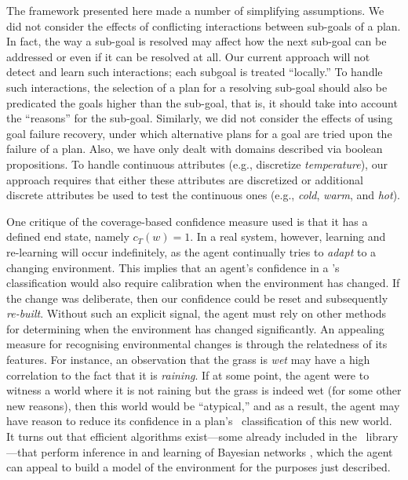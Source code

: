 The framework presented here made a number of simplifying assumptions.
We did not consider the effects of conflicting interactions between sub-goals of
a plan. In fact, the way a sub-goal is resolved may affect how the next sub-goal
can be addressed or even if it can be resolved at all.
Our current approach will not detect and learn such interactions; each subgoal
is treated ``locally.'' To handle such interactions, the selection of a plan for
a resolving sub-goal should also be predicated the goals higher than the
sub-goal, that is, it should take into account the ``reasons'' for the sub-goal.
Similarly, we did not consider the effects of using goal failure recovery, under
which alternative plans for a goal are tried upon the failure of a plan.
Also, we have only dealt with domains described via boolean propositions. To
handle continuous attributes (e.g., discretize \emph{temperature}), our approach
requires that either these attributes are discretized or additional discrete
attributes be used to test the continuous ones (e.g., \emph{cold}, \emph{warm},
and \emph{hot}).


One critique of the coverage-based confidence measure used is that it has a
defined end state, namely $c_T(w)=1$. In a real system, however, learning and
re-learning will occur indefinitely, as the agent continually tries to
\emph{adapt} to a changing environment. This implies that an agent's confidence
in a \dt's classification would also require calibration when the environment has
changed. If the change was deliberate, then our confidence could be reset and
subsequently \textit{re-built}. Without such an explicit signal, the agent must
rely on other methods for determining when the environment has changed
significantly.
An appealing measure for recognising environmental changes is through the
relatedness of its features. For instance, an observation that the grass is
\textit{wet} may have a high correlation to the fact that it is \textit{raining}.
If at some point, the agent were to witness a world where it is not raining but
the grass is indeed wet (for some other new reasons), then this world would be
``atypical,''  and as a result, the agent may have reason to reduce its
confidence in a plan's \dt\ classification of this new world.
It turns out that efficient algorithms exist---some already included in the
\weka\ library---that perform inference in and learning of Bayesian networks
\cite{Mitchell97:ML}, which the agent can appeal to build a model of the
environment for the purposes just described.



